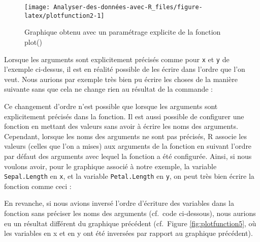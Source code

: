 \documentclass[
]{book}
\newenvironment{Shaded}{\begin{snugshade}}{\end{snugshade}}
\newcommand{\AttributeTok}[1]{\textcolor[rgb]{0.77,0.63,0.00}{#1}}
\newcommand{\FunctionTok}[1]{\textcolor[rgb]{0.00,0.00,0.00}{#1}}
\newcommand{\NormalTok}[1]{#1}
\newcommand{\SpecialCharTok}[1]{\textcolor[rgb]{0.00,0.00,0.00}{#1}}
\begin{document}
\begin{figure}

{\centering \texttt{[image: Analyser-des-données-avec-R\_files/figure-latex/plotfunction2-1]} 

}

\caption{Graphique obtenu avec un paramétrage explicite de la fonction plot()}\label{fig:plotfunction2}
\end{figure}

Lorsque les arguments sont explicitement précisés comme pour \texttt{x} et \texttt{y} de l'exemple ci-dessus, il est en réalité possible de les écrire dans l'ordre que l'on veut. Nous aurions par exemple très bien pu écrire les choses de la manière suivante sans que cela ne change rien au résultat de la commande :

\begin{Shaded}
\end{Shaded}

Ce changement d'ordre n'est possible que lorsque les arguments sont explicitement précisés dans la fonction. Il est aussi possible de configurer une fonction en mettant des valeurs sans avoir à écrire les noms des arguments. Cependant, lorsque les noms des arguments ne sont pas précisés, R associe les valeurs (celles que l'on a mises) aux arguments de la fonction en suivant l'ordre par défaut des arguments avec lequel la fonction a été configurée. Ainsi, si nous voulons avoir, pour le graphique associé à notre exemple, la variable \texttt{Sepal.Length} en \texttt{x}, et la variable \texttt{Petal.Length} en \texttt{y}, on peut très bien écrire la fonction comme ceci :

\begin{Shaded}
\end{Shaded}

En revanche, si nous avions inversé l'ordre d'écriture des variables dans la fonction sans préciser les noms des arguments (cf.~code ci-dessous), nous aurions eu un résultat différent du graphique précédent (cf.~Figure \ref{fig:plotfunction5}, où les variables en x et en y ont été inversées par rapport au graphique précédent).
\end{document}
